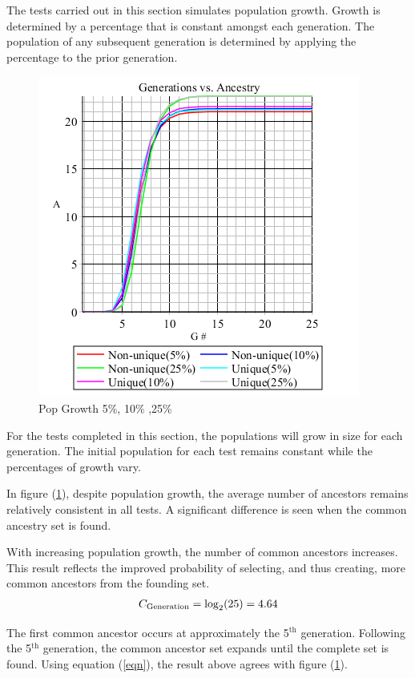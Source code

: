 \documentclass[12pt]{extarticle}
\begin{document}
The tests carried out in this section simulates population growth. Growth is determined by a percentage that is constant amongst each generation. The population of any subsequent generation is determined by applying the percentage to the prior generation.
\begin{figure}
	\includegraphics[scale=0.50]{Graph7.png}
	\caption{Pop Growth 5\%, 10\% ,25\%}
	\label{fig:img7}
\end{figure}
For the tests completed in this section, the populations will grow in size for each generation. The initial population for each test remains constant while the percentages of growth vary.

In figure (\ref{fig:img7}), despite population growth, the average number of ancestors remains relatively consistent in all tests. A significant difference is seen when the common ancestry set is found. 

With increasing population growth, the number of common ancestors increases. This result reflects the improved probability of selecting, and thus creating, more common ancestors from the founding set. 
\begin{align}
\notag
C_{\text{Generation}} = \log_2(25) = 4.64
\end{align}


The first common ancestor occurs at approximately the 5$^{\text{th}}$ generation. Following the 5$^{\text{th}}$ generation, the common ancestor set expands until the complete set is found. Using equation (\ref{eqn}), the result above agrees with figure (\ref{fig:img7}).
\end{document}
